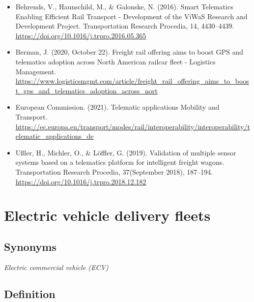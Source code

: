 \documentclass[
]{book}
\providecommand{\tightlist}{%
  \setlength{\itemsep}{0pt}\setlength{\parskip}{0pt}}
\begin{document}
\begin{itemize}
\tightlist
\item
  Behrends, V., Haunschild, M., \& Galonske, N. (2016). Smart Telematics Enabling Efficient Rail Transport - Development of the ViWaS Research and Development Project. Transportation Research Procedia, 14, 4430--4439. \url{https://doi.org/10.1016/j.trpro.2016.05.365}
\item
  Berman, J. (2020, October 22). Freight rail offering aims to boost GPS and telematics adoption across North American railcar fleet - Logistics Management. \url{https://www.logisticsmgmt.com/article/freight_rail_offering_aims_to_boost_gps_and_telematics_adoption_across_nort}
\item
  European Commission. (2021). Telematic applications \textbar{} Mobility and Transport. \url{https://ec.europa.eu/transport/modes/rail/interoperability/interoperability/telematic_applications_de}
\item
  Ußler, H., Michler, O., \& Löffler, G. (2019). Validation of multiple sensor systems based on a telematics platform for intelligent freight wagons. Transportation Research Procedia, 37(September 2018), 187--194. \url{https://doi.org/10.1016/j.trpro.2018.12.182}
\end{itemize}

\hypertarget{electric_delivery_fleets}{%
\section{Electric vehicle delivery fleets}\label{electric_delivery_fleets}}

\hypertarget{synonyms-23}{%
\subsection*{Synonyms}\label{synonyms-23}}

\emph{Electric commercial vehicle (ECV)}

\hypertarget{definition-27}{%
\subsection*{Definition}\label{definition-27}}
\end{document}
